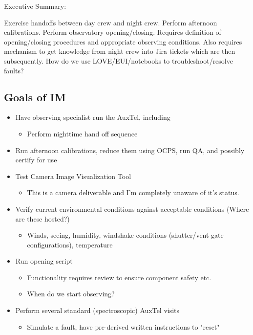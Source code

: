 
Executive Summary:

Exercise handoffs between day crew and night crew. Perform afternoon calibrations.
Perform observatory opening/closing. 
Requires definition of opening/closing procedures and appropriate observing conditions.
Also requires mechanism to get knowledge from night crew into Jira tickets which are then subsequently.
How do we use LOVE/EUI/notebooks to troubleshoot/resolve faults?

\subsection{Goals of IM}
\begin{itemize}
\item Have observing specialist run the AuxTel, including
  \begin{itemize}
  \item Perform nighttime hand off sequence
  \end{itemize}
\item Run afternoon calibrations, reduce them using \gls{OCPS}, run QA, and possibly certify for use
\item Test Camera Image Visualization Tool
  \begin{itemize}
  \item This is a camera deliverable and I'm completely unaware of it's status.
  \end{itemize}
\item Verify current environmental conditions against acceptable conditions (Where are these hosted?)
  \begin{itemize}
  \item Winds, seeing, humidity, windshake conditions (shutter/vent gate configurations), temperature
  \end{itemize}
\item Run opening script
  \begin{itemize}
  \item Functionality requires review to ensure component safety etc.
  \item When do we start observing?
  \end{itemize}
\item Perform several standard (spectroscopic) AuxTel visits
  \begin{itemize}
  \item Simulate a fault, have pre-derived written instructions to "reset" 

\end{itemize}
\end{itemize}
